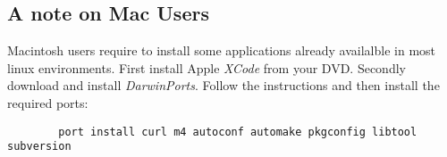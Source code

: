 \subsection{A note on Mac Users}
Macintosh users require to install some applications already availalble in most linux environments. First install Apple \emph{XCode} from your DVD. Secondly download and install \emph{DarwinPorts}. Follow the instructions and then install the required ports:
\begin{lstlisting}
	    port install curl m4 autoconf automake pkgconfig libtool subversion
\end{lstlisting}

